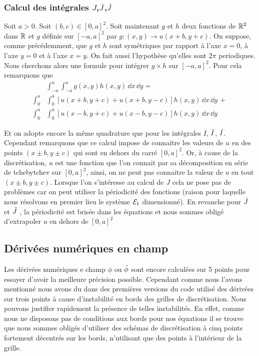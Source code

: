 \documentclass[10pt]{article}
\begin{document}
\begin{multicols}{2}
\vspace*{11pt}




\subsubsection{Calcul des intégrales $J$,$\bar{J}$,$\tilde{J}$ }

Soit $a>0$. Soit $(b,c) \in [0,a]^2$. Soit maintenant $g$ et $h$ deux fonctions de $\mathbb{R}^2$ dans $\mathbb{R}$ et  $g$ définie sur $[-a, a]^2$  par $g : (x,y) \rightarrow u(x+b, y+c)$. On suppose, comme précédemment, que $g$ et $h$ sont symétriques par rapport à l'axe $x=0$, à l'axe $y=0$ et à l'axe $x=y$. On fait aussi l'hypothèse qu'elles sont $2\pi$ periodiques. Nous cherchons alors une formule pour intégrer $g\times h$ sur $[-a, a]^2$. Pour cela remarquons que
\begin{equation}
\begin{split}
 & \int_{-a}^{a} \int_{-a}^{a} g(x,y) h(x,y) \,  \dd x \, \dd y  = \\
 \int_{0}^{a} & \int_{0}^{a} [u(x+b, y+c) + u(x+b, y-c)] h(x,y) \, \dd x \, \dd y \, + \\ 
\int_{0}^{a} & \int_{0}^{a} [u(x-b, y+c) + u(x-b, y-c)] h(x,y)  \, \dd x \, \dd y 
\end{split}
\end{equation}

Et on adopte encore la même quadrature que pour les intégrales $I$, $\bar{I}$, $\tilde{I}$. Cependant remarquons que ce calcul impose de connaitre les valeurs de $u$ en des points $(x \pm b, y\pm c)$ qui sont en dehors du carré $[0, a]^2$. Or, à cause de la discrétisation, $u$ est une fonction que l'on connait par sa décomposition en série de tchebytchev sur $[0,a]^2$, ainsi, on ne peut pas connaitre la valeur de $u$ en tout $(x\pm b, y\pm c)$. Lorsque l'on s'intéresse au calcul de $J$ cela ne pose pas de problèmes car on peut utiliser la périodicité des fonctions (raison pour laquelle nous résolvons en premier lieu le système $\mathcal{E}_1$ dimensionné). En revanche pour $\bar{J}$ et $\tilde{J}$ , la périodicité est brisée dans les équations et nous sommes obligé d'extrapoler $u$ en dehors de $[0,a]^2$





\subsection{Dérivées numériques en champ }

Les dérivées numériques e champ $\phi$ ou $\tilde{\phi}$ sont encore calculées sur 5 points pour essayer d'avoir la meilleure  précision possible. Cependant comme nous l'avons mentionné nous avons du dans des premières versions du code utilisé des dérivées sur trois points à cause d'instabilité en bords des grilles de discrétisation. Nous pouvons justifier rapidement la présence de telles instabilités. En effet, comme nous ne disposons pas de conditions aux bords pour nos équations il se trouve que nous sommes obligés d'utiliser des schémas de discrétisation à cinq points fortement décentrés sur les bords, n'utilisant que des points à l'intérieur de la grille.\\



\end{multicols}
\end{document}
